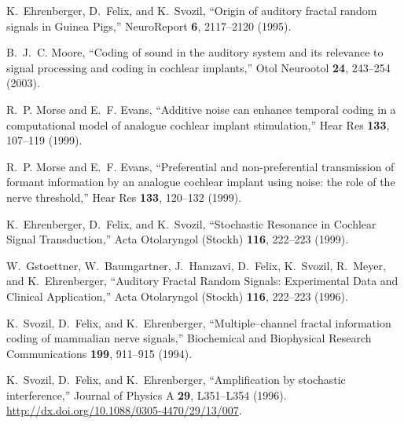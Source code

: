 \documentclass[prl,preprint,amsfonts,showpacs,showkeys]{revtex4}
\begin{document}
\begin{thebibliography}{10}
K.~Ehrenberger, D.~Felix, and K.~Svozil, \enquote{Origin of auditory fractal
  random signals in Guinea Pigs,} NeuroReport \textbf{6}, 2117--2120 (1995).

B.~J.~C. Moore, \enquote{Coding of sound in the auditory system and its
  relevance to signal processing and coding in cochlear implants,} Otol
  Neurootol \textbf{24}, 243--254 (2003).

R.~P. Morse and E.~F. Evans, \enquote{Additive noise can enhance temporal
  coding in a computational model of analogue cochlear implant stimulation,}
  Hear Res \textbf{133}, 107--119 (1999).

R.~P. Morse and E.~F. Evans, \enquote{Preferential and non-preferential
  transmission of formant information by an analogue cochlear implant using
  noise: the role of the nerve threshold,} Hear Res \textbf{133}, 120--132
  (1999).

K.~Ehrenberger, D.~Felix, and K.~Svozil, \enquote{Stochastic Resonance in
  Cochlear Signal Transduction,} Acta Otolaryngol (Stockh) \textbf{116},
  222--223 (1999).

W.~Gstoettner, W.~Baumgartner, J.~Hamzavi, D.~Felix, K.~Svozil, R.~Meyer, and
  K.~Ehrenberger, \enquote{Auditory Fractal Random Signals: Experimental Data
  and Clinical Application,} Acta Otolaryngol (Stockh) \textbf{116}, 222--223
  (1996).

K.~Svozil, D.~Felix, and K.~Ehrenberger, \enquote{Multiple--channel fractal
  information coding of mammalian nerve signals,} Biochemical and Biophysical
  Research Communications \textbf{199}, 911--915 (1994).

K.~Svozil, D.~Felix, and K.~Ehrenberger, \enquote{Amplification by stochastic
  interference,} Journal of Physics A \textbf{29}, L351--L354 (1996).
  \urlprefix\url{http://dx.doi.org/10.1088/0305-4470/29/13/007}.

\end{thebibliography}
\end{document}
